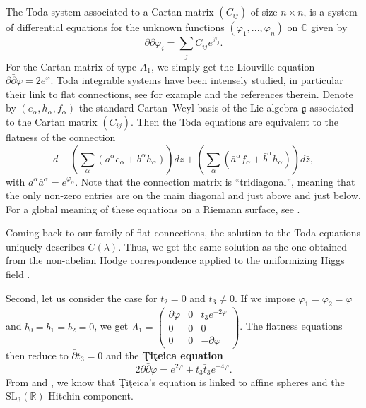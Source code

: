 \documentclass[11pt]{amsart}
\numberwithin{thm}{section} %
\numberwithin{equation}{section} %
\numberwithin{figure}{section} %
\newcommand*{\R}{\mathbb{R}}
\newcommand*{\C}{\mathbb{C}}
\renewcommand*{\l}{\lambda}
\newcommand*{\del}{\partial}
\newcommand*{\delbar}{\bar\partial}
\begin{document}
The Toda system associated to a Cartan matrix $(C_{ij})$ of size $n\times n$, is a system of differential equations for the unknown functions $(\varphi_1,...,\varphi_n)$ on $\C$ given by $$\partial\bar\partial \varphi_i=\sum_j C_{ij}e^{\varphi_j}.$$
For the Cartan matrix of type $A_1$, we simply get the Liouville equation $\partial\bar\partial\varphi=2e^\varphi$. Toda integrable systems have been intensely studied, in particular their link to flat connections, see for example \cite{Leznov} and the references therein. Denote by $(e_\alpha,h_\alpha,f_\alpha)$ the standard Cartan--Weyl basis of the Lie algebra $\mathfrak{g}$ associated to the Cartan matrix $(C_{ij})$. Then the Toda equations are equivalent to the flatness of the connection 
\begin{equation}\label{Eq:tridiagonal}
d+\left(\textstyle\sum_\alpha (a^\alpha e_\alpha +b^\alpha h_\alpha)\right)dz+\left(\textstyle\sum_\alpha (\bar{a}^\alpha f_\alpha +\bar{b}^\alpha h_\alpha)\right)d\bar{z},
\end{equation}
with $a^\alpha \bar{a}^\alpha = e^{\varphi_\alpha}$. Note that the connection matrix is ``tridiagonal'', meaning that the only non-zero entries are on the main diagonal and just above and just below. For a global meaning of these equations on a Riemann surface, see \cite[Section 5.3]{Baraglia}.

Coming back to our family of flat connections, the solution to the Toda equations uniquely describes $C(\l)$. Thus, we get the same solution as the one obtained from the non-abelian Hodge correspondence applied to the uniformizing Higgs field \cite{AF, Baraglia}.


\medskip
Second, let us consider the case for $t_2=0$ and $t_3\neq 0$. If we impose $\varphi_1=\varphi_2=\varphi$ and $b_0=b_1=b_2=0$, we get $A_1=\left(\begin{smallmatrix}\partial\varphi &0&t_3e^{-2\varphi}\\0&0&0\\ 0&0&-\partial\varphi\end{smallmatrix}\right)$. The flatness equations then reduce to $\bar\partial t_3=0$ and the \textbf{\c{T}i\c{t}eica equation} 
\begin{equation}\label{Titeica}
2\del\delbar \varphi = e^{2\varphi}+t_3\bar{t}_3e^{-4\varphi}.
\end{equation}
From \cite{Loftin} and \cite{Labourie-cubic}, we know that \c{T}i\c{t}eica's equation is linked to affine spheres and the $\mathrm{SL}_3(\R)$-Hitchin component. 
\end{document}
